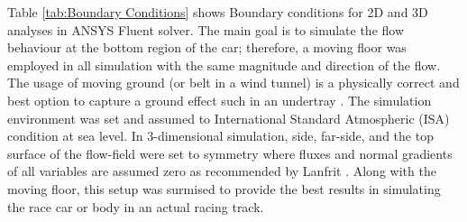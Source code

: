 \noindent Table \ref{tab:Boundary Conditions} shows Boundary conditions for 2D and 3D analyses in ANSYS Fluent solver. The main goal is to simulate the flow behaviour at the bottom region of the car; therefore, a moving floor was employed in all simulation with the same magnitude and direction of the flow. The usage of moving ground (or belt in a wind tunnel) is a physically correct and best option to capture a ground effect such in an undertray \cite{Zhang2006GroundCars}\cite{Burgin1986WINDEFFECT}. The simulation environment was set and assumed to International Standard Atmospheric (ISA) condition at sea level. 
\vspace{1cm}
\noindent In 3-dimensional simulation, side, far-side, and the top surface of the flow-field were set to symmetry where fluxes and normal gradients of all variables are assumed zero \cite{ANSYS2009SymmetryConditions} as recommended by Lanfrit \cite{Lanfrit2005BestFLUENT}. Along with the moving floor, this setup was surmised to provide the best results in simulating the race car or body in an actual racing track.





